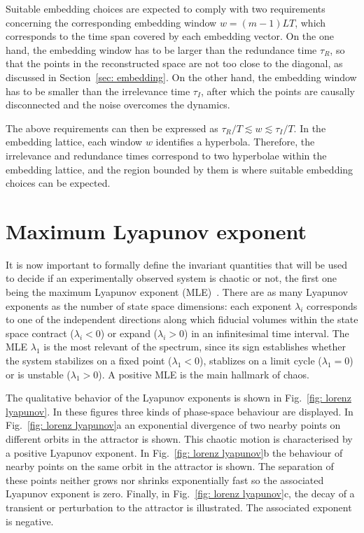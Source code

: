 Suitable embedding choices are expected to comply with two requirements concerning the
corresponding embedding window $w=(m-1)LT$, which corresponds to the
time span covered by each embedding vector.
On the one hand, the embedding window has to be larger than the redundance time $\tau_R$, so that
the points in the reconstructed space are not too close to the diagonal, as discussed in Section~\ref{sec: embedding}.
On the other hand, the embedding window has to be
smaller than the irrelevance time $\tau_I$, after which the points are causally disconnected
and the noise overcomes the dynamics.

The above requirements can then be expressed as $\tau_R/T \lesssim w \lesssim \tau_I/T$.
In the embedding lattice, each window $w$ identifies a hyperbola.
Therefore, the irrelevance and redundance times correspond to two hyperbolae
within the embedding lattice, and the region bounded by them is where suitable
embedding choices can be expected.


\section{Maximum Lyapunov exponent}\label{sec: mle}

It is now important to formally define the invariant
quantities that will be used to decide if an experimentally observed system is chaotic or not,
the first one being the maximum Lyapunov
exponent (MLE)~\cite{ref:abarbanel_fourier_spectra,wolf1986quantifying}.
There are as many Lyapunov exponents as the number of state space dimensions: each exponent $\lambda_i$
corresponds to one of the independent directions along which fiducial volumes within the state space
contract ($\lambda_i<0$) or expand ($\lambda_i>0$) in an infinitesimal time interval.
The MLE $\lambda_1$ is the most relevant of the spectrum, since its sign establishes whether the system
stabilizes on a fixed point ($\lambda_1<0$), stablizes on a limit cycle ($\lambda_1=0$) or is unstable
($\lambda_1>0$). A positive MLE is the main hallmark of chaos.

The qualitative behavior of the Lyapunov exponents is shown in Fig.~\ref{fig: lorenz lyapunov}.
In these figures three kinds of phase-space behaviour are displayed.
In Fig.~\ref{fig: lorenz lyapunov}a an exponential divergence
of two nearby points on different orbits in the attractor is shown.
This chaotic motion is
characterised by a positive Lyapunov exponent. In Fig.~\ref{fig: lorenz lyapunov}b the
behaviour of nearby points on the same orbit in the attractor is shown. The
separation of these points neither grows nor shrinks exponentially fast so
the associated Lyapunov exponent is zero. Finally, in Fig.~\ref{fig: lorenz lyapunov}c, the
decay of a transient or perturbation to the attractor is illustrated.
The associated exponent is negative.

